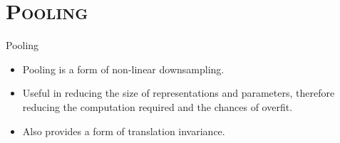 \section{\scshape Pooling}
\begin{frame}{Pooling}
	\begin{itemize}
		\item Pooling is a form of non-linear downsampling.
		\item Useful in reducing the size of representations and parameters, therefore reducing the computation required and the chances of overfit.
		\item Also provides a form of translation invariance.
	\end{itemize}
\end{frame}

